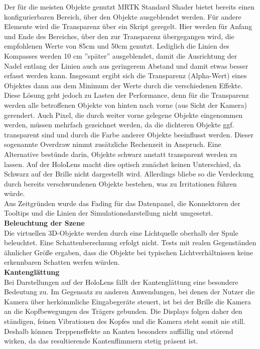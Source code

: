 Der für die meisten Objekte genutzt MRTK Standard Shader bietet bereits einen konfigurierbaren Bereich, über den Objekte ausgeblendet werden. Für andere Elemente wird die Transparenz über ein Skript geregelt. Hier werden für Anfang und Ende des Bereiches, über den zur Transparenz übergegangen wird, die empfohlenen Werte von 85cm und 50cm genutzt. Lediglich die Linien des Kompasses werden 10 cm ''später'' ausgeblendet, damit die Ausrichtung der Nadel entlang der Linien auch aus geringerem Abstand und damit etwas besser erfasst werden kann. Insgesamt ergibt sich die Transparenz (Alpha-Wert) eines Objektes dann aus dem Minimum der Werte durch die verschiedenen Effekte.\\

Diese Lösung geht jedoch zu Lasten der Performance, denn für die Transparenz werden alle betroffenen Objekte von hinten nach vorne (aus Sicht der Kamera) gerendert. Auch Pixel, die durch weiter vorne gelegene Objekte eingenommen werden, müssen mehrfach gezeichnet werden, da die dichteren Objekte ggf. transparent sind und durch die Farbe anderer Objekte beeinflusst werden. Dieser sogenannte Overdraw nimmt zusätzliche Rechenzeit in Anspruch. Eine Alternative bestünde darin, Objekte schwarz anstatt transparent werden zu lassen. Auf der HoloLens macht dies optisch zunächst keinen Unterschied, da Schwarz auf der Brille nicht dargestellt wird. Allerdings bliebe so die Verdeckung durch bereits verschwundenen Objekte bestehen, was zu Irritationen führen würde.\\

Aus Zeitgründen wurde das Fading für das Datenpanel, die Konnektoren der Tooltips und die Linien der Simulationsdarstellung nicht umgesetzt.\\

\textbf{Beleuchtung der Szene}\\
Die virtuellen 3D-Objekte werden durch eine Lichtquelle oberhalb der Spule beleuchtet. Eine Schattenberechnung erfolgt nicht. Tests mit realen Gegenständen ähnlicher Größe ergaben, dass die Objekte bei typischen Lichtverhältnissen keine erkennbaren Schatten werfen würden.\\

\textbf{Kantenglättung}\\
Bei Darstellungen auf der HoloLens fällt der Kantenglättung eine besondere Bedeutung zu. Im Gegensatz zu anderen Anwendungen, bei denen der Nutzer die Kamera über herkömmliche Eingabegeräte steuert, ist bei der Brille die Kamera an die Kopfbewegungen des Trägers gebunden. Die Displays folgen daher den ständigen, feinen Vibrationen des Kopfes und die Kamera steht somit nie still. Deshalb können Treppeneffekte an Kanten besonders auffällig und störend wirken, da das resultierende Kantenflimmern stetig präsent ist.\\


